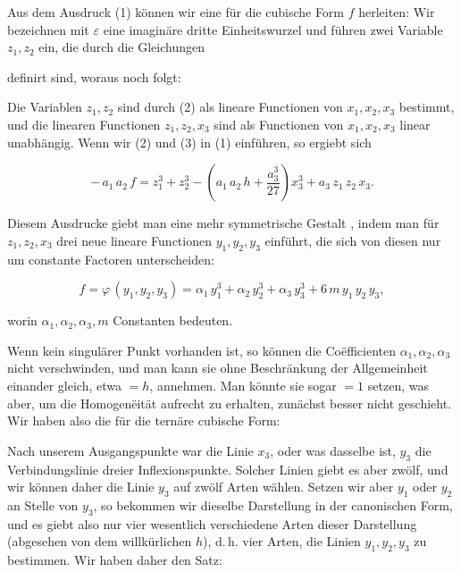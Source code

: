 Aus dem Ausdruck (1) können wir eine 
 für die cubische Form $f$ herleiten:
Wir bezeichnen mit $\varepsilon$ eine imaginäre dritte Einheitswurzel
und führen zwei Variable $z_1, z_2$ ein, die durch die Gleichungen


definirt sind, woraus noch folgt:


Die Variablen $z_1, z_2$ sind durch (2) als lineare Functionen
von $x_1, x_2, x_3$ bestimmt, und die linearen Functionen $z_1, z_2, x_3$
sind als Functionen von $x_1, x_2, x_3$ linear unabhängig. Wenn wir
(2) und (3) in (1) einführen, so ergiebt sich

\[
-\,a_1\,a_2\,f = z_1^3 + z_2^3 - \left(a_1\,a_2\,h + \frac{a_3^3}{27}\right)x_3^3 + a_3\,z_1\,z_2\,x_3.
\]

Diesem Ausdrucke giebt man eine mehr symmetrische Gestalt
, indem man für $z_1, z_2, x_3$ drei neue lineare Functionen
$y_1, y_2, y_3$ einführt, die sich von diesen nur um constante Factoren
unterscheiden:

\[
f = \varphi\,(y_1,y_2,y_3) = \alpha_1\,y_1^3 + \alpha_2\,y_2^3 + \alpha_3\,y_3^3 + 6\,m\,y_1\,y_2\,y_3,
\]

worin $\alpha_1, \alpha_2, \alpha_3, m$ Constanten bedeuten.

Wenn kein singulärer Punkt vorhanden ist, so können die
Coëfficienten $\alpha_1, \alpha_2, \alpha_3$ nicht verschwinden, und man kann sie
ohne Beschränkung der Allgemeinheit einander gleich, etwa $=h$,
annehmen. Man könnte sie sogar $=1$ setzen, was aber, um die
Homogenëität aufrecht zu erhalten, zunächst besser nicht geschieht.
Wir haben also die  für die ternäre
cubische Form:


Nach unserem Ausgangspunkte war die Linie $x_3$, oder was
dasselbe ist, $y_3$ die Verbindungslinie dreier Inflexionspunkte.
Solcher Linien giebt es aber zwölf, und wir können daher die
Linie $y_3$ auf zwölf Arten wählen. Setzen wir aber $y_1$ oder $y_2$ an
Stelle von $y_3$, so bekommen wir dieselbe Darstellung in der
canonischen Form, und es giebt also nur vier wesentlich verschiedene
 Arten dieser Darstellung (abgesehen von dem willkürlichen
 $h$), d.\,h. vier Arten, die Linien $y_1, y_2, y_3$ zu bestimmen. Wir
haben daher den Satz:
